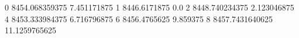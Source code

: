 0 8454.068359375 7.451171875
1 8446.6171875 0.0
2 8448.740234375 2.123046875
4 8453.333984375 6.716796875
6 8456.4765625 9.859375
8 8457.7431640625 11.1259765625
